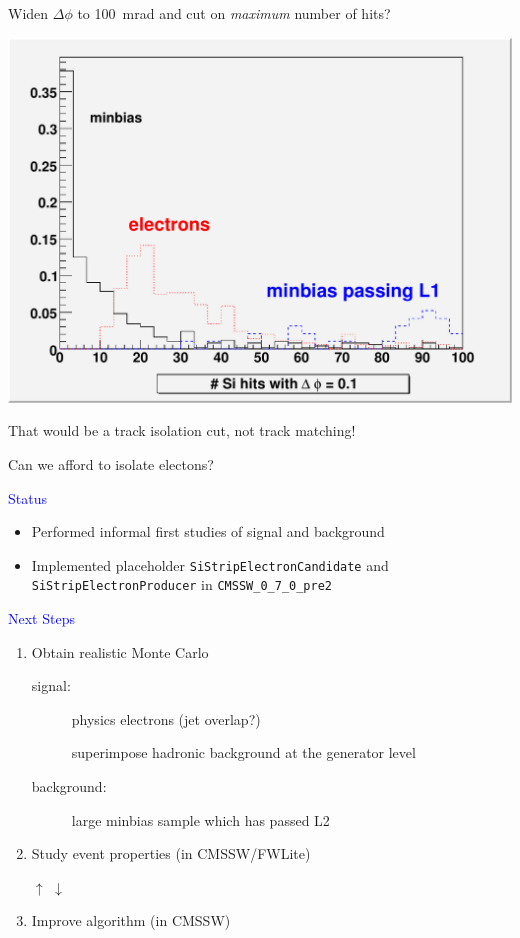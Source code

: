 \documentclass[12pt,compress]{beamer}
\begin{document}
\begin{frame}
Widen $\Delta \phi$ to 100~mrad and cut on {\it maximum} number of hits?

\begin{center}
\includegraphics[width=0.65\linewidth]{hitdistributions_wide}
\end{center}

That would be a track isolation cut, not track matching!

Can we afford to isolate electons?

\begin{center}
\textcolor{blue}{}
\end{center}
\end{frame}

\begin{frame}
\textcolor{blue}{\Large \hspace{-0.87 cm} Status}
\begin{itemize}
\item Performed informal first studies of signal and background
\item Implemented placeholder {\tt SiStripElectronCandidate} and
{\tt SiStripElectronProducer} in {\tt CMSSW\_0\_7\_0\_pre2}
\end{itemize}

\vfill
\textcolor{blue}{\Large \hspace{-0.87 cm} Next Steps}
\begin{enumerate}
\item Obtain realistic Monte Carlo
\begin{description}
\item[signal:] physics electrons (jet overlap?)

superimpose hadronic background at the generator level

\item[background:] large minbias sample which has passed L2

\end{description}

\item Study event properties (in CMSSW/FWLite)

\hspace{2.5 cm} $\uparrow$ \hspace{0.5 cm} $\downarrow$

\item Improve algorithm (in CMSSW)
\end{enumerate}

\label{numpages}
\end{frame}
\end{document}
